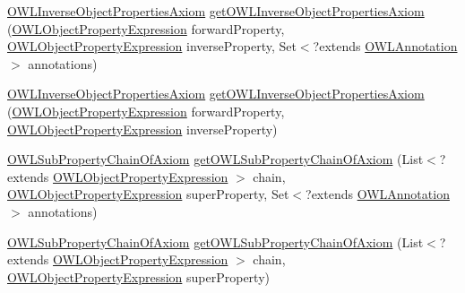 \begin{DoxyCompactItemize}
\item 
\hyperlink{interfaceorg_1_1semanticweb_1_1owlapi_1_1model_1_1_o_w_l_inverse_object_properties_axiom}{O\-W\-L\-Inverse\-Object\-Properties\-Axiom} \hyperlink{classuk_1_1ac_1_1manchester_1_1cs_1_1owl_1_1owlapi_1_1_o_w_l_data_factory_impl_aeda14640e41cd2081bc9e35225ae4f69}{get\-O\-W\-L\-Inverse\-Object\-Properties\-Axiom} (\hyperlink{interfaceorg_1_1semanticweb_1_1owlapi_1_1model_1_1_o_w_l_object_property_expression}{O\-W\-L\-Object\-Property\-Expression} forward\-Property, \hyperlink{interfaceorg_1_1semanticweb_1_1owlapi_1_1model_1_1_o_w_l_object_property_expression}{O\-W\-L\-Object\-Property\-Expression} inverse\-Property, Set$<$?extends \hyperlink{interfaceorg_1_1semanticweb_1_1owlapi_1_1model_1_1_o_w_l_annotation}{O\-W\-L\-Annotation} $>$ annotations)
\item 
\hyperlink{interfaceorg_1_1semanticweb_1_1owlapi_1_1model_1_1_o_w_l_inverse_object_properties_axiom}{O\-W\-L\-Inverse\-Object\-Properties\-Axiom} \hyperlink{classuk_1_1ac_1_1manchester_1_1cs_1_1owl_1_1owlapi_1_1_o_w_l_data_factory_impl_af3c5bf95620efcb0596246a57c656a1d}{get\-O\-W\-L\-Inverse\-Object\-Properties\-Axiom} (\hyperlink{interfaceorg_1_1semanticweb_1_1owlapi_1_1model_1_1_o_w_l_object_property_expression}{O\-W\-L\-Object\-Property\-Expression} forward\-Property, \hyperlink{interfaceorg_1_1semanticweb_1_1owlapi_1_1model_1_1_o_w_l_object_property_expression}{O\-W\-L\-Object\-Property\-Expression} inverse\-Property)
\item 
\hyperlink{interfaceorg_1_1semanticweb_1_1owlapi_1_1model_1_1_o_w_l_sub_property_chain_of_axiom}{O\-W\-L\-Sub\-Property\-Chain\-Of\-Axiom} \hyperlink{classuk_1_1ac_1_1manchester_1_1cs_1_1owl_1_1owlapi_1_1_o_w_l_data_factory_impl_a234bf3804b65aac42fc994361471c0e0}{get\-O\-W\-L\-Sub\-Property\-Chain\-Of\-Axiom} (List$<$?extends \hyperlink{interfaceorg_1_1semanticweb_1_1owlapi_1_1model_1_1_o_w_l_object_property_expression}{O\-W\-L\-Object\-Property\-Expression} $>$ chain, \hyperlink{interfaceorg_1_1semanticweb_1_1owlapi_1_1model_1_1_o_w_l_object_property_expression}{O\-W\-L\-Object\-Property\-Expression} super\-Property, Set$<$?extends \hyperlink{interfaceorg_1_1semanticweb_1_1owlapi_1_1model_1_1_o_w_l_annotation}{O\-W\-L\-Annotation} $>$ annotations)
\item 
\hyperlink{interfaceorg_1_1semanticweb_1_1owlapi_1_1model_1_1_o_w_l_sub_property_chain_of_axiom}{O\-W\-L\-Sub\-Property\-Chain\-Of\-Axiom} \hyperlink{classuk_1_1ac_1_1manchester_1_1cs_1_1owl_1_1owlapi_1_1_o_w_l_data_factory_impl_a4bc59f66a0238cce304e78e0f34b3c42}{get\-O\-W\-L\-Sub\-Property\-Chain\-Of\-Axiom} (List$<$?extends \hyperlink{interfaceorg_1_1semanticweb_1_1owlapi_1_1model_1_1_o_w_l_object_property_expression}{O\-W\-L\-Object\-Property\-Expression} $>$ chain, \hyperlink{interfaceorg_1_1semanticweb_1_1owlapi_1_1model_1_1_o_w_l_object_property_expression}{O\-W\-L\-Object\-Property\-Expression} super\-Property)

\end{DoxyCompactItemize}
